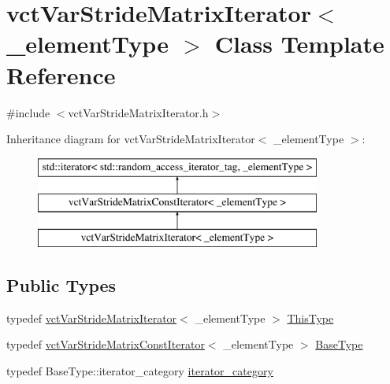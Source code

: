 \hypertarget{classvct_var_stride_matrix_iterator}{}\section{vct\+Var\+Stride\+Matrix\+Iterator$<$ \+\_\+element\+Type $>$ Class Template Reference}
\label{classvct_var_stride_matrix_iterator}


{\ttfamily \#include $<$vct\+Var\+Stride\+Matrix\+Iterator.\+h$>$}

Inheritance diagram for vct\+Var\+Stride\+Matrix\+Iterator$<$ \+\_\+element\+Type $>$\+:\begin{figure}[H]
\begin{center}
\leavevmode
\includegraphics[height=3.000000cm]{da/d89/classvct_var_stride_matrix_iterator}
\end{center}
\end{figure}
\subsection*{Public Types}
\begin{DoxyCompactItemize}
\item 
typedef \hyperlink{classvct_var_stride_matrix_iterator}{vct\+Var\+Stride\+Matrix\+Iterator}$<$ \+\_\+element\+Type $>$ \hyperlink{classvct_var_stride_matrix_iterator_a70b8fef02244dad380a0836d86afdd3e}{This\+Type}
\item 
typedef \hyperlink{classvct_var_stride_matrix_const_iterator}{vct\+Var\+Stride\+Matrix\+Const\+Iterator}$<$ \+\_\+element\+Type $>$ \hyperlink{classvct_var_stride_matrix_iterator_adfcc105f210fef52621dd5ea9fe8b937}{Base\+Type}
\item 
typedef Base\+Type\+::iterator\+\_\+category \hyperlink{classvct_var_stride_matrix_iterator_a4666721e510380bfb3c0947d8d37eab9}{iterator\+\_\+category}
\end{DoxyCompactItemize}
